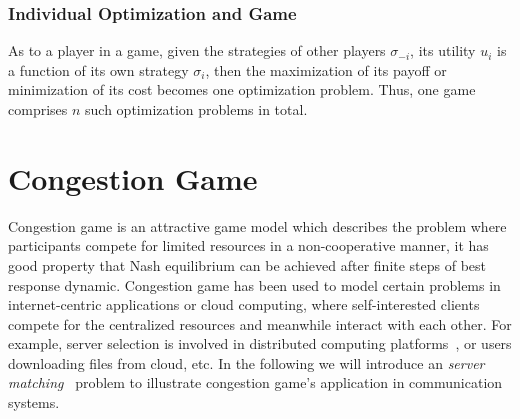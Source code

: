 

\subsubsection*{Individual Optimization and Game}
As to a player in a game, given the strategies of other players $\sigma_{-i}$, its utility $u_i$ is a function of its own strategy $\sigma_i$, then the maximization of its payoff or minimization of its cost becomes one optimization problem.
Thus, one game comprises $n$ such optimization problems in total.





\section{Congestion Game}
\label{congsetion_game}




Congestion game is an attractive game model which describes the problem where participants compete for limited resources in a non-cooperative manner, it has good property that Nash equilibrium can be achieved after finite steps of best response dynamic.
Congestion game has been used to model certain problems in internet-centric applications or cloud computing, where self-interested clients compete for the centralized resources and meanwhile interact with each other.
For example, server selection is involved in distributed computing platforms~\cite{Cloud_Computing_2010}, or users downloading files from cloud, etc.
In the following we will introduce an \textit{server matching}~\cite{kothari:congestion_serverMatching} problem to illustrate congestion game's application in communication systems.

